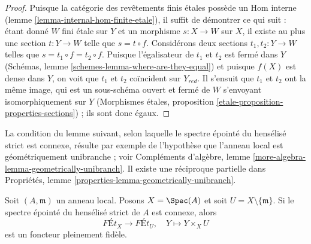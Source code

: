 \begin{proof}
Puisque la catégorie des revêtements finis étales possède un
Hom interne (lemme \ref{lemma-internal-hom-finite-etale}),
il suffit de démontrer ce qui suit : étant donné $W$ fini étale sur $Y$
et un morphisme $s : X \to W$ sur $X$, il existe au plus une section
$t : Y \to W$ telle que $s = t \circ f$. Considérons deux sections
$t_1, t_2 : Y \to W$ telles que $s = t_1 \circ f = t_2 \circ f$.
Puisque l'égalisateur de $t_1$ et $t_2$ est fermé dans $Y$
(Schémas, lemme \ref{schemes-lemma-where-are-they-equal})
et puisque $f(X)$ est dense dans $Y$, on voit que $t_1$ et $t_2$
coïncident sur $Y_{red}$. Il s'ensuit que $t_1$ et $t_2$ ont
la même image, qui est un sous-schéma ouvert et fermé de $W$ s'envoyant
isomorphiquement sur $Y$
(Morphismes étales, proposition \ref{etale-proposition-properties-sections}) ;
ils sont donc égaux.
\end{proof}

\noindent
La condition du lemme suivant, selon laquelle le spectre épointé
du hensélisé strict est connexe, résulte par exemple de
l'hypothèse que l'anneau local est géométriquement unibranche ; voir
Compléments d'algèbre, lemme \ref{more-algebra-lemma-geometrically-unibranch}.
Il existe une réciproque partielle dans
Propriétés, lemme \ref{properties-lemma-geometrically-unibranch}.

\begin{lemma}
\label{lemma-same-etale-extensions}
Soit $(A, \mathfrak m)$ un anneau local. Posons $X = \Spec(A)$
et soit $U = X \setminus \{\mathfrak m\}$. Si le spectre épointé
du hensélisé strict de $A$ est connexe, alors
$$
\textit{F\'Et}_X \longrightarrow \textit{F\'Et}_U,\quad
Y \longmapsto Y \times_X U
$$
est un foncteur pleinement fidèle.
\end{lemma}

